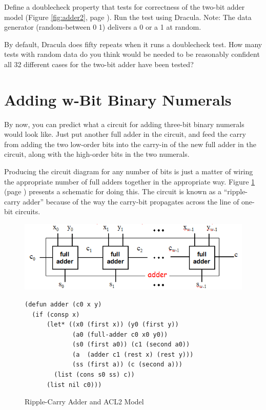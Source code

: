\begin{ExerciseList}
\Exercise Define a doublecheck property that tests
for correctness of the two-bit adder model
(Figure \ref{fig:adder2}, page \pageref{fig:adder2}).
Run the test using Dracula.
Note: The data generator (random-between 0 1) delivers
a 0 or a 1 at random.

\Exercise By default, Dracula does fifty repeats
when it runs a doublecheck test.
How many tests with random data do you think would be needed to be reasonably
confident all 32 different cases for the two-bit adder have been tested?
\end{ExerciseList}

\section{Adding w-Bit Binary Numerals}
\label{sec:adding-w-bit-numerals}

By now, you can predict what a circuit for adding three-bit
binary numerals would look like.
Just put another full adder in the circuit, and feed the
carry from adding the two low-order bits into the carry-in
of the new full adder in the circuit, along with
the high-order bits in the two numerals.

Producing the circuit diagram for any number of bits
is just a matter of wiring the appropriate number of
full adders together in the appropriate way.
Figure \ref{fig:adder} (page \pageref{fig:adder}) presents a schematic for doing this.
The circuit is known as a ``ripple-carry adder'' because
of the way the carry-bit propagates across the line
of one-bit circuits.

\begin{figure}
\begin{center}
\includegraphics[scale=0.9]{Images/adder.png}
\begin{lstlisting}
(defun adder (c0 x y)
  (if (consp x)
      (let* ((x0 (first x)) (y0 (first y))
             (a0 (full-adder c0 x0 y0))
             (s0 (first a0)) (c1 (second a0))
             (a  (adder c1 (rest x) (rest y)))
             (ss (first a)) (c (second a)))
        (list (cons s0 ss) c))
      (list nil c0)))
\end{lstlisting}
\end{center}
\caption{Ripple-Carry Adder and ACL2 Model}
\label{fig:adder}
\end{figure}

